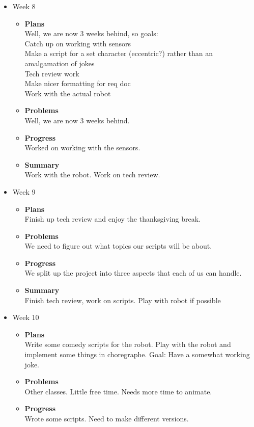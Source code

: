 \begin{itemize}
		\item{Week 8}
		\begin{itemize}
			\item \textbf{Plans} \\
			Well, we are now 3 weeks behind, so goals: \\
Catch up on working with sensors \\
Make a script for a set character (eccentric?) rather than an amalgamation of jokes \\
Tech review work \\
Make nicer formatting for req doc \\
Work with the actual robot
			\item \textbf{Problems} \\
			Well, we are now 3 weeks behind.
			\item \textbf{Progress} \\
			Worked on working with the sensors.
			\item \textbf{Summary} \\
Work with the robot. Work on tech review.
		\end{itemize}
		\item{Week 9}
		\begin{itemize}
			\item \textbf{Plans} \\
			Finish up tech review and enjoy the thanksgiving break.
			\item \textbf{Problems} \\
			We need to figure out what topics our scripts will be about.
			\item \textbf{Progress} \\
			We split up the project into three aspects that each of us can handle.
			\item \textbf{Summary} \\
			Finish tech review, work on scripts. Play with robot if possible
		\end{itemize}
		\item{Week 10}
		\begin{itemize}
			\item \textbf{Plans} \\
			Write some comedy scripts for the robot. Play with the robot and implement some things in choregraphe. Goal: Have a somewhat working joke.
			\item \textbf{Problems} \\
			Other classes. Little free time. Needs more time to animate.
			\item \textbf{Progress} \\
Wrote some scripts. Need to make different versions.
		\end{itemize}
	\end{itemize}
